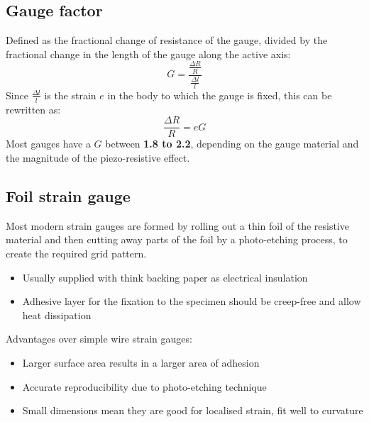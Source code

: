 \documentclass[class=report, crop=false, 12pt,a4paper, tikz, border=4mm]{standalone}
\begin{document}
\subsection{Gauge factor}
Defined as the fractional change of resistance of the gauge, divided by the fractional change in the length of the gauge along the active axis:
\begin{equation}
  G = \frac{\frac{\Delta R}{R}}{\frac{\Delta l}{l}}
\end{equation}
Since $\frac{\Delta l}{l}$ is the strain $e$ in the body to which the gauge is fixed, this can be rewritten as:
\begin{equation}
  \frac{\Delta R}{R} = eG
\end{equation}
Most gauges have a $G$ between \textbf{1.8 to 2.2}, depending on the gauge material and the magnitude of the piezo-resistive effect.
\subsection{Foil strain gauge}
Most modern strain gauges are formed by rolling out a thin foil of the resistive material and then cutting away parts of the foil by a photo-etching process, to create the required grid pattern.
\begin{itemize}
  \item Usually supplied with think backing paper as electrical insulation
  \item Adhesive layer for the fixation to the specimen should be creep-free and allow heat dissipation
\end{itemize}
Advantages over simple wire strain gauges:
\begin{itemize}
  \item Larger surface area results in a larger area of adhesion
  \item Accurate reproducibility due to photo-etching technique
  \item Small dimensions mean they are good for localised strain, fit well to curvature
\end{itemize}
\end{document}
